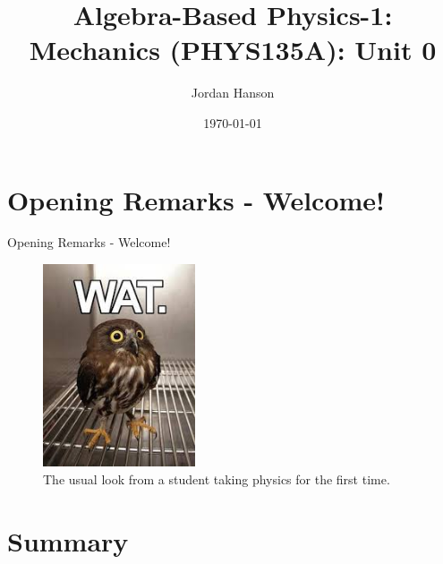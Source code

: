 \documentclass{beamer}
\title{Algebra-Based Physics-1: Mechanics (PHYS135A): Unit 0}
\date{\today}
\author{Jordan Hanson}
\institute{Whittier College Department of Physics and Astronomy}
\begin{document}
\maketitle

\section{Opening Remarks - Welcome!}

\begin{frame}{Opening Remarks - Welcome!}
\small
\begin{figure}
\centering
\includegraphics[width=0.4\textwidth]{../../../watowl.jpeg}
\caption{\label{fig:wat1} The usual look from a student taking physics for the first time.}
\end{figure}
\end{frame}

\section{Summary}
\end{document}
